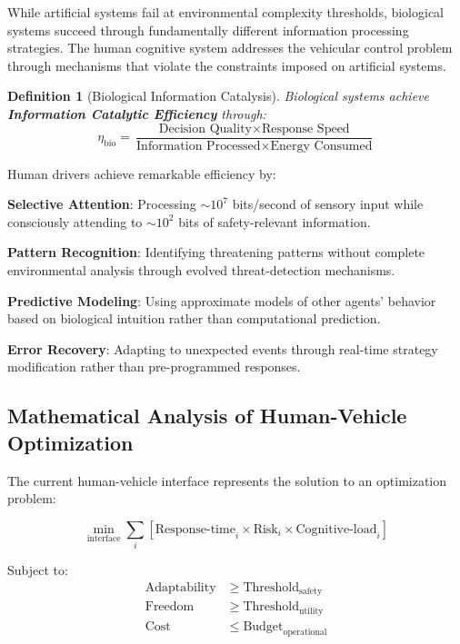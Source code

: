 \documentclass[12pt,a4paper]{article}
\newtheorem{definition}[theorem]{Definition}
\begin{document}
While artificial systems fail at environmental complexity thresholds, biological systems succeed through fundamentally different information processing strategies. The human cognitive system addresses the vehicular control problem through mechanisms that violate the constraints imposed on artificial systems.

\begin{definition}[Biological Information Catalysis]
Biological systems achieve \textbf{Information Catalytic Efficiency} through:
$$\eta_{\text{bio}} = \frac{\text{Decision Quality} \times \text{Response Speed}}{\text{Information Processed} \times \text{Energy Consumed}}$$
\end{definition}

Human drivers achieve remarkable efficiency by:

\textbf{Selective Attention}: Processing $\sim 10^7$ bits/second of sensory input while consciously attending to $\sim 10^2$ bits of safety-relevant information.

\textbf{Pattern Recognition}: Identifying threatening patterns without complete environmental analysis through evolved threat-detection mechanisms.

\textbf{Predictive Modeling}: Using approximate models of other agents' behavior based on biological intuition rather than computational prediction.

\textbf{Error Recovery}: Adapting to unexpected events through real-time strategy modification rather than pre-programmed responses.

\subsection{Mathematical Analysis of Human-Vehicle Optimization}

The current human-vehicle interface represents the solution to an optimization problem:

\begin{equation}
\min_{\text{interface}} \sum_{i} [\text{Response-time}_i \times \text{Risk}_i \times \text{Cognitive-load}_i]
\end{equation}

Subject to:
\begin{align}
\text{Adaptability} &\geq \text{Threshold}_{\text{safety}}\\
\text{Freedom} &\geq \text{Threshold}_{\text{utility}}\\
\text{Cost} &\leq \text{Budget}_{\text{operational}}
\end{align}
\end{document}
